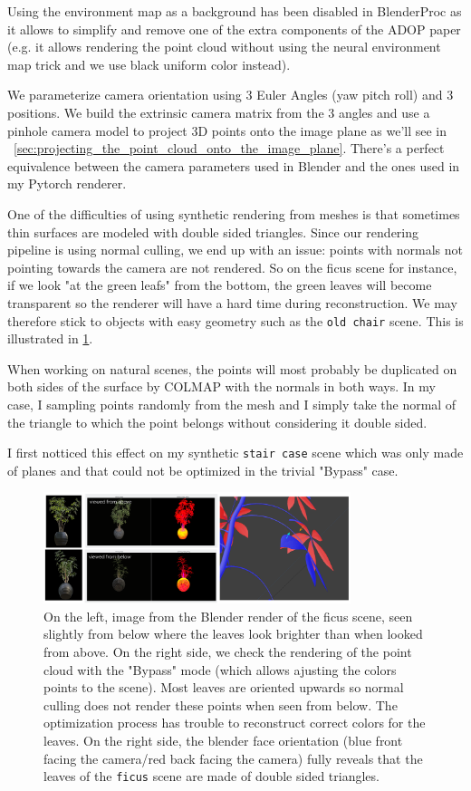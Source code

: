 Using the environment map as a background has been disabled in BlenderProc as it allows to simplify and remove one of the extra components of the ADOP paper (e.g. it allows rendering the point cloud without using the neural environment map trick and we use black uniform color instead).

We parameterize camera orientation using 3 Euler Angles (yaw pitch roll) and 3 positions. We build the extrinsic camera matrix from the 3 angles and use a pinhole camera model to project 3D points onto the image plane as we'll see in ~\cref{sec:projecting_the_point_cloud_onto_the_image_plane}. There's a perfect equivalence between the camera parameters used in Blender and the ones used in my Pytorch renderer.

One of the difficulties of using synthetic rendering from meshes is that sometimes thin surfaces are modeled with double sided triangles. Since our rendering pipeline is using normal culling, we end up with an issue: points with normals not pointing towards the camera are not rendered. So on the ficus scene for instance, if we look "at the green leafs" from the bottom, the green leaves will become transparent so the renderer will have a hard time during reconstruction. We may therefore stick to objects with easy geometry such as the \texttt{old chair} scene. This is illustrated in \cref{fig:ficus_culling_issue}.

When working on natural scenes, the points will most probably be duplicated on both sides of the surface by COLMAP with the normals in both ways. In my case, I sampling points randomly from the mesh and I simply take the normal of the triangle to which the point belongs without considering it double sided.

I first notticed this effect on my synthetic \texttt{stair case} scene which was only made of planes and that could not be optimized in the trivial "Bypass" case.

\begin{figure}
    \centering
    \includegraphics[width=0.8\textwidth]{figures/double_sided_surfaces_issues.png}
    \caption{On the left, image from the Blender render of the ficus scene, seen slightly from below where the leaves look brighter than when looked from above. On the right side, we check the rendering of the point cloud with the "Bypass" mode (which allows ajusting the colors points to the scene). Most leaves are oriented upwards so normal culling does not render these points when seen from below. The optimization process has trouble to reconstruct correct colors for the leaves. On the right side, the blender face orientation (blue front facing the camera/red back facing the camera) fully reveals that the leaves of the \texttt{ficus} scene are made of double sided triangles.}
    \label{fig:ficus_culling_issue}
\end{figure}

